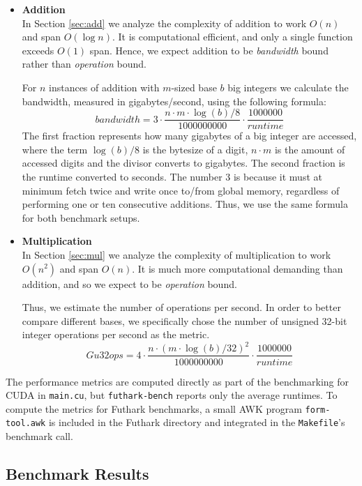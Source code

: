 \begin{itemize}[leftmargin=*]
\item \textbf{Addition}\\
  In Section \ref{sec:add} we analyze the complexity of addition to work $O(n)$ and span $O(\log n)$. It is computational efficient, and only a single  function exceeds $O(1)$ span. Hence, we expect addition to be \textit{bandwidth} bound rather than \textit{operation} bound.

  For $n$ instances of addition with $m$-sized base $b$ big integers we calculate the bandwidth, measured in gigabytes/second, using the following formula:
  \begin{equation}
    \label{eq:bandwidth}
    \mathit{bandwidth} = 3 \cdot \dfrac{n \cdot m \cdot \log(b)/8}{1000000000} \cdot \dfrac{1000000}{\mathit{runtime}}
  \end{equation}
  The first fraction represents how many gigabytes of a big integer are accessed, where the term $\log(b) / 8$ is the bytesize of a digit, $n\cdot m$ is the amount of accessed digits and the divisor converts to gigabytes. The second fraction is the runtime converted to seconds. The number 3 is because it must at minimum fetch twice and write once to/from global memory, regardless of performing one or ten consecutive additions. Thus, we use the same formula for both benchmark setups.
  

\item \textbf{Multiplication}\\
  In Section \ref{sec:mul} we analyze the complexity of multiplication to work $O(n^2)$ and span $O(n)$. It is much more computational demanding than addition, and so we expect to be \textit{operation} bound.

  Thus, we estimate the number of operations per second. In order to better compare different bases, we specifically chose the number of unsigned 32-bit integer operations per second as the metric.
  \begin{equation}
  \label{eq:u32ops}
  \mathit{Gu32ops} = 4\cdot \dfrac{n \cdot (m \cdot \log(b) / 32)^2}{1000000000} \cdot \dfrac{1000000}{\mathit{runtime}}
  \end{equation}
\end{itemize}

The performance metrics are computed directly as part of the benchmarking for CUDA in \texttt{main.cu}, but \texttt{futhark-bench} reports only the average runtimes. To compute the metrics for Futhark benchmarks, a small AWK program \texttt{form-tool.awk} is included in the Futhark directory and integrated in the \texttt{Makefile}'s benchmark call.

\subsection{Benchmark Results}
\label{subsec:benchres}



